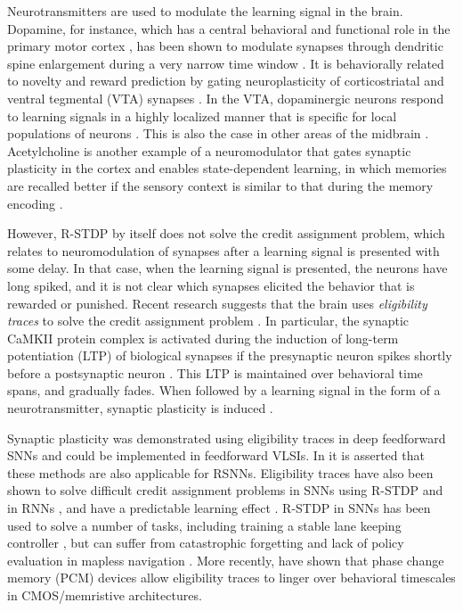 Neurotransmitters are used to modulate the learning signal in the brain.
Dopamine, for instance, which has a central behavioral and functional role in the primary motor cortex \citep{barnes2005activity,dang2006disrupted}, has been shown to modulate synapses through dendritic spine enlargement during a very narrow time window \citep{dang2006disrupted}.
It is behaviorally related to novelty and reward prediction \citep{li2003dopamine,schultz2007behavioral} by gating neuroplasticity of corticostriatal \citep{reynolds2001cellular,reynolds2002dopamine} and ventral tegmental (VTA) synapses \citep{bao2001cortical}.
In the VTA, dopaminergic neurons respond to learning signals in a highly localized manner that is specific for local populations of neurons \citep{engelhard2019specialized}.
This is also the case in other areas of the midbrain \citep{roeper2013dissecting}.
Acetylcholine is another example of a neuromodulator that gates synaptic plasticity in the cortex and enables state-dependent learning, in which memories are recalled better if the sensory context is similar to that during the memory encoding \citep{shulz2000neuronal}.

However, R-STDP by itself does not solve the credit assignment problem, which relates to neuromodulation of synapses after a learning signal is presented with some delay.
In that case, when the learning signal is presented, the neurons have long spiked, and it is not clear which synapses elicited the behavior that is rewarded or punished.
Recent research suggests that the brain uses \emph{eligibility traces} \citep{izhikevich2007solving,florian2007reinforcement} to solve the credit assignment problem \citep{stolyarova2018solving,gerstner2018eligibility}.
In particular, the synaptic CaMKII protein complex is activated during the induction of long-term potentiation (LTP) of biological synapses if the presynaptic neuron spikes shortly before a postsynaptic neuron \citep{sanhueza2013camkii}.
This LTP is maintained over behavioral time spans, and gradually fades.
When followed by a learning signal in the form of a neurotransmitter, synaptic plasticity is induced \citep{yagishita2014critical,cassenaer2012conditional,gerstner2018eligibility}.

Synaptic plasticity was demonstrated using eligibility traces in deep feedforward SNNs \citep{zenke2018superspike,neftci2017event,kaiser2020synaptic} and could be implemented in feedforward VLSIs.
In \citet{zenke2018superspike} it is asserted that these methods are also applicable for RSNNs.
Eligibility traces have also been shown to solve difficult credit assignment problems in SNNs using R-STDP \citep{legenstein2008learning, bellec2020solution} and in RNNs \citep{he2015distinct}, and have a predictable learning effect \citep{legenstein2008learning}.
R-STDP in SNNs has been used to solve a number of tasks, including training a stable lane keeping controller \citep{bing2020indirect}, but can suffer from catastrophic forgetting and lack of policy evaluation in mapless navigation \citep{bing2018end}.
More recently, \citet{demirag2021pcm} have shown that phase change memory (PCM) devices allow eligibility traces to linger over behavioral timescales in CMOS/memristive architectures.


